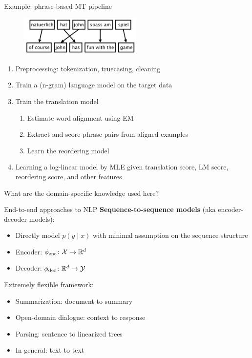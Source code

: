\documentclass[usenames,dvipsnames,notes]{beamer}
\begin{document}
\begin{frame}
    {Example: phrase-based MT pipeline}
    \begin{figure}
        \includegraphics[height=2cm]{figures/pbmt}
    \end{figure}
    \vspace{-2em}
    \begin{enumerate}
        \item Preprocessing: tokenization, truecasing, cleaning
        \item Train a (n-gram) language model on the target data
        \item Train the translation model
            \begin{enumerate}
                \item Estimate word alignment using EM
                \item Extract and score phrase pairs from aligned examples
                \item Learn the reordering model 
            \end{enumerate}
        \item Learning a log-linear model by MLE given translation score, LM score, reordering score, and other features 
    \end{enumerate}
    What are the domain-specific knowledge used here?
\end{frame}

\begin{frame}
    {End-to-end approaches to NLP}
    \textbf{Sequence-to-sequence models} (aka encoder-decoder models):\\
    \begin{itemize}
        \item Directly model $p(y\mid x)$ with minimal assumption on the sequence structure
        \item Encoder: $\phi_{\text{enc}}\colon \mathcal{X} \rightarrow \mathbb{R}^d$
        \item Decoder: $\phi_{\text{dec}}\colon \mathbb{R}^d \rightarrow \mathcal{Y}$ 
    \end{itemize}

    Extremely flexible framework:\\
    \begin{itemize}
        \item Summarization: document to summary
        \item Open-domain dialogue: context to response
        \item Parsing: sentence to linearized trees
        \item In general: text to text
    \end{itemize}
\end{frame}
\end{document}
